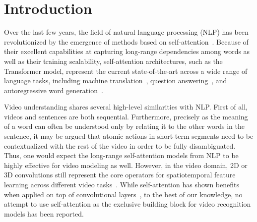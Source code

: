 \documentclass{article}
\begin{document}
\section{Introduction}

Over the last few years, the field of natural language processing (NLP) has been revolutionized by the emergence of methods based on self-attention~\cite{NIPS2017_3f5ee243}. Because of their excellent capabilities at capturing long-range dependencies among words as well as their training scalability, self-attention architectures, such as the Transformer model, represent the current state-of-the-art across a wide range of language tasks, including machine translation~\cite{ott-etal-2018-scaling, chen-etal-2018-best}, question answering~\cite{devlin-etal-2019-bert, dai-etal-2019-transformer}, and autoregressive word generation~\cite{radford2019language, brown2020language}.







Video understanding shares several high-level similarities with NLP. First of all, videos and sentences are both sequential. Furthermore, precisely as the meaning of a word can often be understood only by relating it to the other words in the sentence, it may be argued that atomic actions in short-term segments need to be contextualized with the rest of the video in order to be fully disambiguated. Thus, one would expect the long-range self-attention models from NLP to be highly effective for video modeling as well. However, in the video domain, 2D or 3D convolutions still represent the core operators for spatiotemporal feature learning across different video tasks~\cite{Feichtenhofer_2019_ICCV,  DBLP:conf/eccv/TeedD20, gberta_2020_CVPR}. While self-attention has shown benefits when applied on top of convolutional layers~\cite{Wang_2018_CVPR}, to the best of our knowledge, no attempt to use self-attention as the exclusive building block for video recognition models has been reported. 
\end{document}
